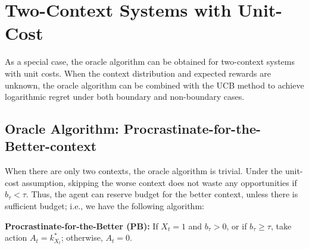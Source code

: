\section{Two-Context Systems with Unit-Cost} \label{app:two_contex}
As a special case, the oracle algorithm can be obtained for two-context systems with unit costs. When the context distribution and expected rewards are unknown, the oracle algorithm can be combined with the UCB method to achieve logarithmic regret under both boundary and non-boundary cases.

\subsection{Oracle Algorithm: Procrastinate-for-the-Better-context}
When there are only two contexts, the oracle algorithm is trivial.
Under the unit-cost assumption, skipping the worse context does not waste any opportunities if $b_\tau < \tau$.
Thus, the agent can reserve budget for the better context, unless there is sufficient budget; i.e., we have the following algorithm:

\textbf{Procrastinate-for-the-Better (PB):} If $X_t = 1$ and $b_\tau > 0$, or if $b_\tau \geq \tau$, take action  $A_t = k_{X_t}^*$;
otherwise, $A_t = 0$.

